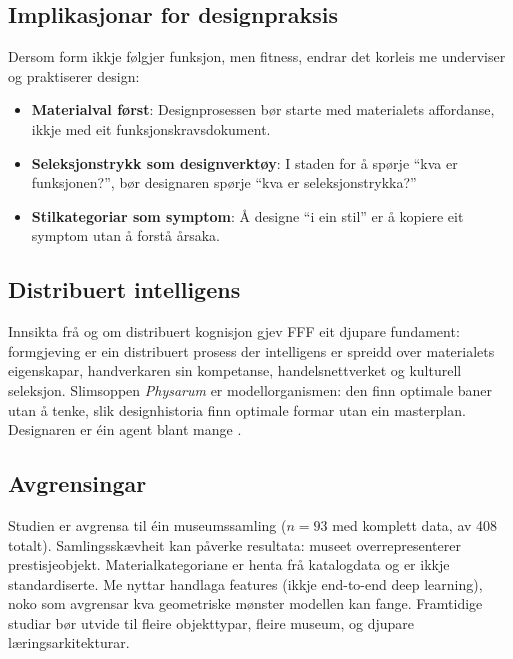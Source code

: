 \documentclass[12pt,a4paper]{article}
\begin{document}
\subsection{Implikasjonar for designpraksis}

Dersom form ikkje f\o{}lgjer funksjon, men fitness, endrar det korleis me underviser og praktiserer design:

\begin{itemize}[nosep]
    \item \textbf{Materialval f\o{}rst}: Designprosessen b\o{}r starte med materialets affordanse, ikkje med eit funksjonskravsdokument.
    \item \textbf{Seleksjonstrykk som designverkt\o{}y}: I staden for \aa{} sp\o{}rje \enquote{kva er funksjonen?}, b\o{}r designaren sp\o{}rje \enquote{kva er seleksjonstrykka?}
    \item \textbf{Stilkategoriar som symptom}: \AA{} designe \enquote{i ein stil} er \aa{} kopiere eit symptom utan \aa{} forst\aa{} \aa{}rsaka.
\end{itemize}

\subsection{Distribuert intelligens}

Innsikta fr\aa{} \citet{levin2019} og \citet{clark2008} om distribuert kognisjon gjev FFF eit djupare fundament: formgjeving er ein distribuert prosess der intelligens er spreidd over materialets eigenskapar, handverkaren sin kompetanse, handelsnettverket og kulturell seleksjon. Slimsoppen \emph{Physarum} \citep{nakagaki2000} er modellorganismen: den finn optimale baner utan \aa{} tenke, slik designhistoria finn optimale formar utan ein masterplan. Designaren er \'{e}in agent blant mange \citep{ingold2007}.

\subsection{Avgrensingar}

Studien er avgrensa til \'{e}in museumssamling ($n = 93$ med komplett data, av 408 totalt). Samlingssk\ae{}vheit kan p\aa{}verke resultata: museet overrepresenterer prestisje\-objekt. Materialkategoriane er henta fr\aa{} katalogdata og er ikkje standardiserte. Me nyttar handlaga features (ikkje end-to-end deep learning), noko som avgrensar kva geometriske m\o{}nster modellen kan fange. Framtidige studiar b\o{}r utvide til fleire objekttypar, fleire museum, og djupare l\ae{}ringsarkitekturar.
\end{document}
